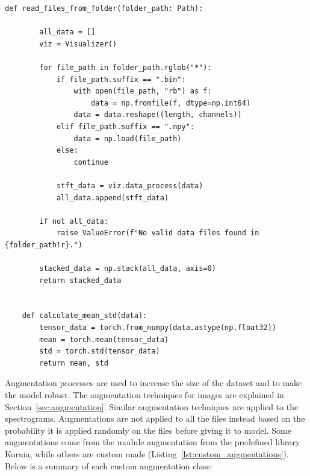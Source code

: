 \begin{lstlisting}[style=pythonstyle, caption={Reading data files and computing dataset statistics}, label=lst:data_reading_stats]
    def read_files_from_folder(folder_path: Path):

        all_data = []
        viz = Visualizer()
    
        for file_path in folder_path.rglob("*"):
            if file_path.suffix == ".bin":
                with open(file_path, "rb") as f:
                    data = np.fromfile(f, dtype=np.int64)
                data = data.reshape((length, channels))
            elif file_path.suffix == ".npy":
                data = np.load(file_path)
            else:
                continue
    
            stft_data = viz.data_process(data)
            all_data.append(stft_data)
    
        if not all_data:
            raise ValueError(f"No valid data files found in {folder_path!r}.")
    
        stacked_data = np.stack(all_data, axis=0)
        return stacked_data
    
    
    def calculate_mean_std(data):
        tensor_data = torch.from_numpy(data.astype(np.float32))
        mean = torch.mean(tensor_data)
        std = torch.std(tensor_data)
        return mean, std
    \end{lstlisting}

Augmentation processes are used to increase the size of the dataset and to make the model robust. The augmentation techniques for images are explained in Section~\ref{sec:augmentation}. Similar augmentation techniques are applied to the spectrograms. Augmentations are not applied to all the files instead based on the probability it is applied randomly on the files before giving it to model. Some augmentations come from the module augmentation from the predefined library Kornia, while others are custom made (Listing~\ref{lst:custom_augmentations}).  Below is a summary of each custom augmentation class:

